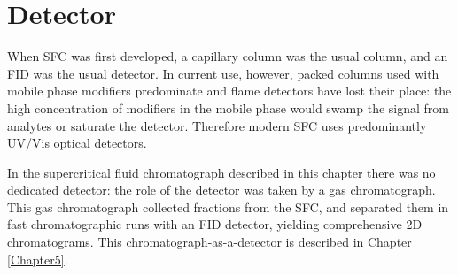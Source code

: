 \section{Detector}

When SFC was first developed, a capillary column was the usual column, and an
FID was the usual detector. In current use, however, packed columns used with
mobile phase modifiers predominate and flame detectors have lost their place:
the high concentration of modifiers in the mobile phase would swamp the signal
from analytes or saturate the detector. Therefore modern SFC uses predominantly
UV/Vis optical detectors.

In the supercritical fluid chromatograph described in this chapter there was no
dedicated detector: the role of the detector was taken by a gas chromatograph.
This gas chromatograph collected fractions from the SFC, and separated them in
fast chromatographic runs with an FID detector, yielding comprehensive 2D
chromatograms. This chromatograph-as-a-detector is described in Chapter
\ref{Chapter5}.
